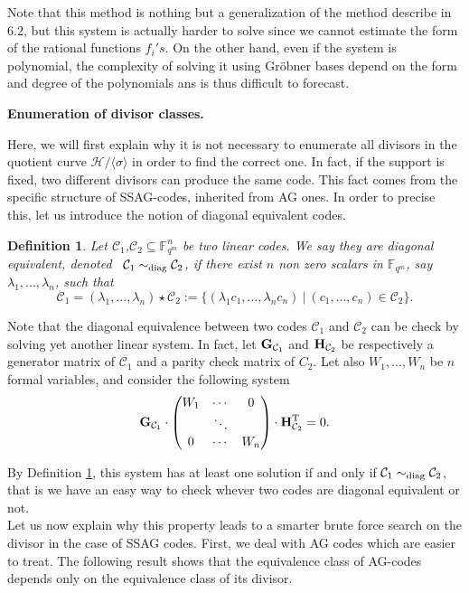 \documentclass[10pt]{article}
\newtheorem{def1}{Definition}[]
\newcommand{\s}{\vspace{0.3cm}}
\newcommand{\cd}{\cdot}
\newcommand{\C}{\mathcal{C}}
\newcommand{\fqm}{\mathbb{F}_{q^m}}
\newcommand{\su}{\subseteq}
\begin{document}
Note that this method is nothing but a generalization of the method describe in 6.2, but this system is actually harder to solve since we cannot estimate the form of the rational functions $f_i's$. On the other hand, even if the system is polynomial, the complexity of solving it using Gröbner bases depend on the form and degree of the polynomials ans is thus difficult to forecast.

\newpage

\bf{Enumeration of divisor classes.} \rm

\s

Here, we will first explain why it is not necessary to enumerate all divisors in the quotient curve $\mathcal{H}/ \langle \sigma \rangle$ in order to find the correct one. In fact, if the support is fixed, two different divisors can produce the same code. This fact comes from the specific structure of SSAG-codes, inherited from AG ones. In order to precise this, let us introduce the notion of diagonal equivalent codes.

\s

\begin{def1} \label{diag}
Let $\C_1$,$\C_2 \su \fqm^n$ be two linear codes. We say they are diagonal equivalent, denoted \ $\C_1 \sim_{\rm diag} \C_2$, if there exist $n$ non zero scalars in $\fqm$, say $\lambda_1,...,\lambda_n$, such that 
\[\C_1 = (\lambda_1,...,\lambda_n) \star \C_2 := \{(\lambda_1c_1,...,\lambda_nc_n) \ | \ (c_1,...,c_n) \in \C_2\}.\]
\end{def1} 

Note that the diagonal equivalence between two codes $\C_1$ and $\C_2$ can be check by solving yet another linear system. In fact, let $\bf{G}_{\rm \C_1}$ and $\bf{H}_{\rm \C_2}$ be respectively a generator matrix of $\C_1$ and a parity check matrix of $C_2$. Let also $W_1,...,W_n$ be $n$ formal variables, and consider the following system
\begin{equation} \label{equiv}
\bf{G}_{\rm \C_1} \cd \begin{pmatrix}
W_1 & \cdots & 0 \\
\null & \ddots & \null \\
0 & \cdots & W_n
\end{pmatrix} \cd \bf{H}_{\rm \C_2}^{\rm T}\rm = 0.
\end{equation}

By Definition \ref{diag}, this system has at least one solution if and only if $\C_1 \sim_{\rm diag} \C_2$, that is we have an easy way to check whever two codes are diagonal equivalent or not. \\
Let us now explain why this property leads to a smarter brute force search on the divisor in the case of SSAG codes. First, we deal with AG codes which are easier to treat. The following result shows that the equivalence class of AG-codes depends only on the equivalence class of its divisor.
\end{document}
